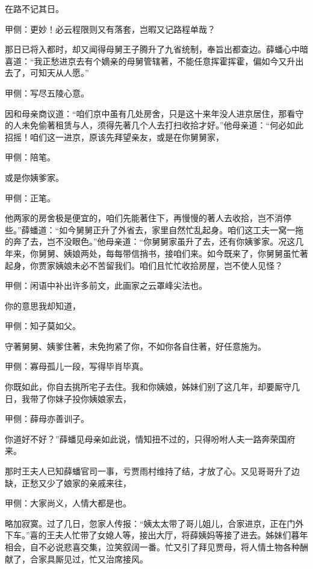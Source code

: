 \begin{parag}
    在路不记其日。\begin{note}甲侧：更妙！必云程限则又有落套，岂暇又记路程单哉？\end{note}那日已将入都时，却又闻得母舅王子腾升了九省统制，奉旨出都查边。薛蟠心中暗喜道：“我正愁进京去有个嫡亲的母舅管辖著，不能任意挥霍挥霍，偏如今又升出去了，可知天从人愿。”\begin{note}甲侧：写尽五陵心意。\end{note}因和母亲商议道：“咱们京中虽有几处房舍，只是这十来年没人进京居住，那看守的人未免偷著租赁与人，须得先著几个人去打扫收拾才好。”他母亲道：“何必如此招摇！咱们这一进京，原该先拜望亲友，或是在你舅舅家，\begin{note}甲侧：陪笔。\end{note}或是你姨爹家。\begin{note}甲侧：正笔。\end{note}他两家的房舍极是便宜的，咱们先能著住下，再慢慢的著人去收拾，岂不消停些。”薛蟠道：“如今舅舅正升了外省去，家里自然忙乱起身。咱们这工夫一窝一拖的奔了去，岂不没眼色。”他母亲道：“你舅舅家虽升了去，还有你姨爹家。况这几年来，你舅舅、姨娘两处，每每带信捎书，接咱们来。如今既来了，你舅舅虽忙著起身，你贾家姨娘未必不苦留我们。咱们且忙忙收拾房屋，岂不使人见怪？\begin{note}甲侧：闲语中补出许多前文，此画家之云罩峰尖法也。\end{note}你的意思我却知道，\begin{note}甲侧：知子莫如父。\end{note}守著舅舅、姨爹住著，未免拘紧了你，不如你各自住著，好任意施为。\begin{note}甲侧：寡母孤儿一段，写得毕肖毕真。\end{note}你既如此，你自去挑所宅子去住。我和你姨娘，姊妹们别了这几年，却要厮守几日，我带了你妹子投你姨娘家去，\begin{note}甲侧：薛母亦善训子。\end{note}你道好不好？”薛蟠见母亲如此说，情知扭不过的，只得吩咐人夫一路奔荣国府来。
\end{parag}


\begin{parag}
    那时王夫人已知薛蟠官司一事，亏贾雨村维持了结，才放了心。又见哥哥升了边缺，正愁又少了娘家的亲戚来往，\begin{note}甲侧：大家尚义，人情大都是也。\end{note}略加寂寞。过了几日，忽家人传报：“姨太太带了哥儿姐儿，合家进京，正在门外下车。”喜的王夫人忙带了女媳人等，接出大厅，将薛姨妈等接了进去。姊妹们暮年相会，自不必说悲喜交集，泣笑叙阔一番。忙又引了拜见贾母，将人情土物各种酬献了，合家具厮见过，忙又治席接风。
\end{parag}


